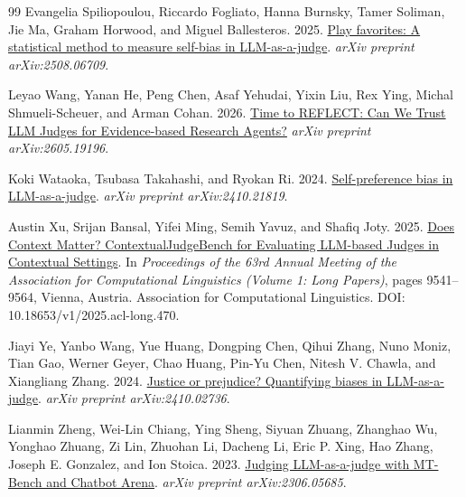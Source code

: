 \begin{thebibliography}{99}
Evangelia Spiliopoulou, Riccardo Fogliato, Hanna Burnsky, Tamer Soliman, Jie Ma, Graham Horwood, and Miguel Ballesteros. 2025.
\newblock \href{https://arxiv.org/abs/2508.06709}{Play favorites: A statistical method to measure self-bias in LLM-as-a-judge}.
\newblock \emph{arXiv preprint arXiv:2508.06709}.

Leyao Wang, Yanan He, Peng Chen, Asaf Yehudai, Yixin Liu, Rex Ying, Michal Shmueli-Scheuer, and Arman Cohan. 2026.
\newblock \href{https://arxiv.org/abs/2605.19196}{Time to REFLECT: Can We Trust LLM Judges for Evidence-based Research Agents?}
\newblock \emph{arXiv preprint arXiv:2605.19196}.

Koki Wataoka, Tsubasa Takahashi, and Ryokan Ri. 2024.
\newblock \href{https://arxiv.org/abs/2410.21819}{Self-preference bias in LLM-as-a-judge}.
\newblock \emph{arXiv preprint arXiv:2410.21819}.

Austin Xu, Srijan Bansal, Yifei Ming, Semih Yavuz, and Shafiq Joty. 2025.
\newblock \href{https://aclanthology.org/2025.acl-long.470/}{Does Context Matter? ContextualJudgeBench for Evaluating LLM-based Judges in Contextual Settings}.
\newblock In \emph{Proceedings of the 63rd Annual Meeting of the Association for Computational Linguistics (Volume 1: Long Papers)}, pages 9541--9564, Vienna, Austria. Association for Computational Linguistics. DOI: 10.18653/v1/2025.acl-long.470.

Jiayi Ye, Yanbo Wang, Yue Huang, Dongping Chen, Qihui Zhang, Nuno Moniz, Tian Gao, Werner Geyer, Chao Huang, Pin-Yu Chen, Nitesh V. Chawla, and Xiangliang Zhang. 2024.
\newblock \href{https://arxiv.org/abs/2410.02736}{Justice or prejudice? Quantifying biases in LLM-as-a-judge}.
\newblock \emph{arXiv preprint arXiv:2410.02736}.

Lianmin Zheng, Wei-Lin Chiang, Ying Sheng, Siyuan Zhuang, Zhanghao Wu, Yonghao Zhuang, Zi Lin, Zhuohan Li, Dacheng Li, Eric P. Xing, Hao Zhang, Joseph E. Gonzalez, and Ion Stoica. 2023.
\newblock \href{https://arxiv.org/abs/2306.05685}{Judging LLM-as-a-judge with MT-Bench and Chatbot Arena}.
\newblock \emph{arXiv preprint arXiv:2306.05685}.

\end{thebibliography}
